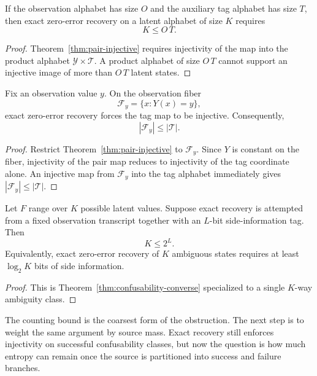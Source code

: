 \begin{corollary}\label{cor:global-budget}
If the observation alphabet has size $O$ and the auxiliary tag alphabet has size $T$, then exact zero-error recovery on a latent alphabet of size $K$ requires
\[
K \le O\,T.
\]
\end{corollary}

\begin{proof}
Theorem~\ref{thm:pair-injective} requires injectivity of the map into the product alphabet $\mathcal Y \times \mathcal T$. A product alphabet of size $O\,T$ cannot support an injective image of more than $O\,T$ latent states.
\end{proof}

\begin{theorem}\label{thm:fiber-cardinality}
Fix an observation value $y$. On the observation fiber
\[
\mathcal F_y=\{x : Y(x)=y\},
\]
exact zero-error recovery forces the tag map to be injective. Consequently,
\[
|\mathcal F_y| \le |\mathcal T|.
\]
\end{theorem}

\begin{proof}
Restrict Theorem~\ref{thm:pair-injective} to $\mathcal F_y$. Since $Y$ is constant on the fiber, injectivity of the pair map reduces to injectivity of the tag coordinate alone. An injective map from $\mathcal F_y$ into the tag alphabet immediately gives $|\mathcal F_y| \le |\mathcal T|$.
\end{proof}

\begin{theorem}\label{thm:fano-converse}
Let $F$ range over $K$ possible latent values. Suppose exact recovery is attempted from a fixed observation transcript together with an $L$-bit side-information tag. Then
\[
K \le 2^L.
\]
Equivalently, exact zero-error recovery of $K$ ambiguous states requires at least $\log_2 K$ bits of side information.
\end{theorem}

\begin{proof}
This is Theorem~\ref{thm:confusability-converse} specialized to a single $K$-way ambiguity class.
\end{proof}

The counting bound is the coarsest form of the obstruction. The next step is to weight the same argument by source mass. Exact recovery still enforces injectivity on successful confusability classes, but now the question is how much entropy can remain once the source is partitioned into success and failure branches.

